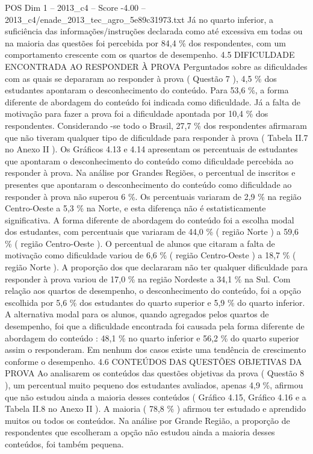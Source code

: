 \begin{textsample}{POS Dim 1 – 2013\_c4 – Score -4.00 – 2013\_c4/enade\_2013\_tec\_agro\_5e89c31973.txt}
Já no quarto inferior, a suficiência das informações/instruções declarada como até excessiva em todas ou na maioria das questões foi percebida por 84,4 \% dos respondentes, com um comportamento crescente com os quartos de desempenho. 4.5 DIFICULDADE ENCONTRADA AO RESPONDER À PROVA Perguntados sobre as dificuldades com as quais se depararam ao responder à prova ( Questão 7 ), 4,5 \% dos estudantes apontaram o desconhecimento do conteúdo.
Para 53,6 \%, a forma diferente de abordagem do conteúdo foi indicada como dificuldade.
Já a falta de motivação para fazer a prova foi a dificuldade apontada por 10,4 \% dos respondentes.
Considerando -se todo o Brasil, 27,7 \% dos respondentes afirmaram que não tiveram qualquer tipo de dificuldade para responder à prova ( Tabela II.7 no Anexo II ).
Os Gráficos 4.13 e 4.14 apresentam os percentuais de estudantes que apontaram o desconhecimento do conteúdo como dificuldade percebida ao responder à prova.
Na análise por Grandes Regiões, o percentual de inscritos e presentes que apontaram o desconhecimento do conteúdo como dificuldade ao responder à prova não superou 6 \%.
Os percentuais variaram de 2,9 \% na região Centro-Oeste a 5,3 \% na Norte, e esta diferença não é estatisticamente significativa.
A forma diferente de abordagem do conteúdo foi a escolha modal dos estudantes, com percentuais que variaram de 44,0 \% ( região Norte ) a 59,6 \% ( região Centro-Oeste ).
O percentual de alunos que citaram a falta de motivação como dificuldade variou de 6,6 \% ( região Centro-Oeste ) a 18,7 \% ( região Norte ).
A proporção dos que declararam não ter qualquer dificuldade para responder à prova variou de 17,0 \% na região Nordeste a 34,1 \% na Sul.
Com relação aos quartos de desempenho, o desconhecimento do conteúdo, foi a opção escolhida por 5,6 \% dos estudantes do quarto superior e 5,9 \% do quarto inferior.
A alternativa modal para os alunos, quando agregados pelos quartos de desempenho, foi que a dificuldade encontrada foi causada pela forma diferente de abordagem do conteúdo : 48,1 \% no quarto inferior e 56,2 \% do quarto superior assim o responderam.
Em nenhum dos casos existe uma tendência de crescimento conforme o desempenho. 4.6 CONTEÚDOS DAS QUESTÕES OBJETIVAS DA PROVA Ao analisarem os conteúdos das questões objetivas da prova ( Questão 8 ), um percentual muito pequeno dos estudantes avaliados, apenas 4,9 \%, afirmou que não estudou ainda a maioria desses conteúdos ( Gráfico 4.15, Gráfico 4.16 e a Tabela II.8 no Anexo II ).
A maioria ( 78,8 \% ) afirmou ter estudado e aprendido muitos ou todos os conteúdos.
Na análise por Grande Região, a proporção de respondentes que escolheram a opção não estudou ainda a maioria desses conteúdos, foi também pequena.

\end{textsample}
